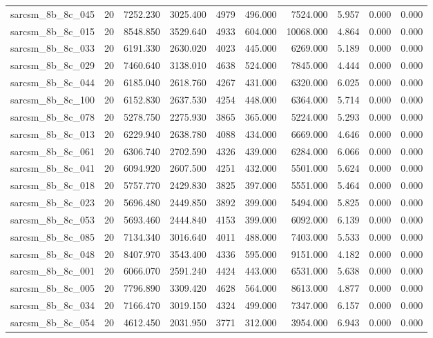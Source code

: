 \begin{tabular}{lrrrrrrrrr}
sarcsm\_8b\_8c\_045 & 20 & 7252.230 & 3025.400 & 4979 & 496.000 & 7524.000 & 5.957 & 0.000 & 0.000 \\
sarcsm\_8b\_8c\_015 & 20 & 8548.850 & 3529.640 & 4933 & 604.000 & 10068.000 & 4.864 & 0.000 & 0.000 \\
sarcsm\_8b\_8c\_033 & 20 & 6191.330 & 2630.020 & 4023 & 445.000 & 6269.000 & 5.189 & 0.000 & 0.000 \\
sarcsm\_8b\_8c\_029 & 20 & 7460.640 & 3138.010 & 4638 & 524.000 & 7845.000 & 4.444 & 0.000 & 0.000 \\
sarcsm\_8b\_8c\_044 & 20 & 6185.040 & 2618.760 & 4267 & 431.000 & 6320.000 & 6.025 & 0.000 & 0.000 \\
sarcsm\_8b\_8c\_100 & 20 & 6152.830 & 2637.530 & 4254 & 448.000 & 6364.000 & 5.714 & 0.000 & 0.000 \\
sarcsm\_8b\_8c\_078 & 20 & 5278.750 & 2275.930 & 3865 & 365.000 & 5224.000 & 5.293 & 0.000 & 0.000 \\
sarcsm\_8b\_8c\_013 & 20 & 6229.940 & 2638.780 & 4088 & 434.000 & 6669.000 & 4.646 & 0.000 & 0.000 \\
sarcsm\_8b\_8c\_061 & 20 & 6306.740 & 2702.590 & 4326 & 439.000 & 6284.000 & 6.066 & 0.000 & 0.000 \\
sarcsm\_8b\_8c\_041 & 20 & 6094.920 & 2607.500 & 4251 & 432.000 & 5501.000 & 5.624 & 0.000 & 0.000 \\
sarcsm\_8b\_8c\_018 & 20 & 5757.770 & 2429.830 & 3825 & 397.000 & 5551.000 & 5.464 & 0.000 & 0.000 \\
sarcsm\_8b\_8c\_023 & 20 & 5696.480 & 2449.850 & 3892 & 399.000 & 5494.000 & 5.825 & 0.000 & 0.000 \\
sarcsm\_8b\_8c\_053 & 20 & 5693.460 & 2444.840 & 4153 & 399.000 & 6092.000 & 6.139 & 0.000 & 0.000 \\
sarcsm\_8b\_8c\_085 & 20 & 7134.340 & 3016.640 & 4011 & 488.000 & 7403.000 & 5.533 & 0.000 & 0.000 \\
sarcsm\_8b\_8c\_048 & 20 & 8407.970 & 3543.400 & 4336 & 595.000 & 9151.000 & 4.182 & 0.000 & 0.000 \\
sarcsm\_8b\_8c\_001 & 20 & 6066.070 & 2591.240 & 4424 & 443.000 & 6531.000 & 5.638 & 0.000 & 0.000 \\
sarcsm\_8b\_8c\_005 & 20 & 7796.890 & 3309.420 & 4628 & 564.000 & 8613.000 & 4.877 & 0.000 & 0.000 \\
sarcsm\_8b\_8c\_034 & 20 & 7166.470 & 3019.150 & 4324 & 499.000 & 7347.000 & 6.157 & 0.000 & 0.000 \\
sarcsm\_8b\_8c\_054 & 20 & 4612.450 & 2031.950 & 3771 & 312.000 & 3954.000 & 6.943 & 0.000 & 0.000 \\

\end{tabular}
